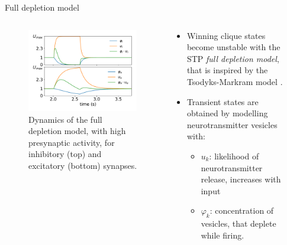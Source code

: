 \documentclass[final,hyperref={pdfpagelabels=false}]{beamer}
\begin{document}
\begin{frame}
\begin{columns}
\begin{column}{.30\textwidth}
\begin{minipage}[T]{.95\textwidth}
{	 	} %
		\end{minipage}
	\end{column}
	\hfil
	\begin{column}{.60\textwidth}
		\begin{minipage}[T]{.95\textwidth}
		\parbox[t][\columnheight]{\textwidth}{
		\vfil
		\begin{block}{Full depletion model}
			\begin{columns}
				\begin{column}[T]{.4\textwidth}
				\begin{figure}
					\includegraphics[width=.9\linewidth]{double_depletion_big.pdf}
					\caption{Dynamics of the full depletion model, with high presynaptic activity, for inhibitory (top) and excitatory (bottom) synapses.}
					\label{fig:full_depletion}
				\end{figure}
				\end{column}							
				\begin{column}[T]{.6\textwidth}
					\begin{itemize}
						\item Winning clique states become unstable with the STP \emph{full depletion model}, that is inspired by the Tsodyks-Markram model \cite{tsodyks2008model}.
						
						\item Transient states are obtained by modelling neurotransmitter vesicles with: 
						\begin{itemize}
							\item $u_k$: likelihood of neurotransmitter release, increases with input						
							\item $\varphi_k$: concentration of vesicles, that deplete while firing.
						\end{itemize}
						

\end{itemize}
\end{column}
\end{columns}
\end{block}}
\end{minipage}
\end{column}
\end{columns}
\end{frame}
\end{document}
